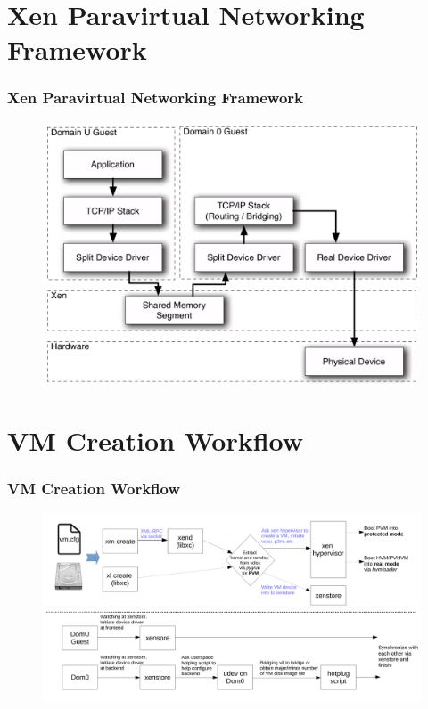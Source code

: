 \documentclass[aspectratio=169]{beamer}
\begin{document}
\section{Xen Paravirtual Networking Framework}
\begin{frame}
\frametitle{Xen Paravirtual Networking Framework}
\begin{figure}
\includegraphics[width=0.6\linewidth]{figures/xennet.pdf}
\end{figure}
\end{frame}


\section{VM Creation Workflow}
\begin{frame}
\frametitle{VM Creation Workflow}
\begin{figure}
\includegraphics[width=1.0\linewidth]{figures/boot.pdf}
\end{figure}
\end{frame}

\end{document}
